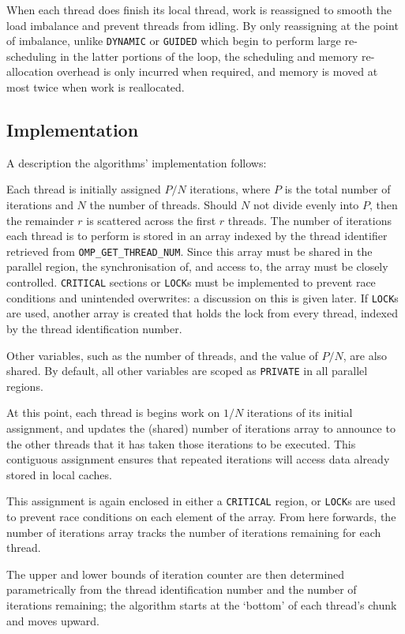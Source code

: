 \documentclass{article} %
\newcommand{\tp}{\texttt}
\begin{document}
When each thread does finish its local thread, work is reassigned to smooth the load imbalance and prevent threads from idling.
By only reassigning at the point of imbalance, unlike \tp{DYNAMIC} or \tp{GUIDED} which begin to perform large re-scheduling in the latter portions of the loop, the scheduling and memory re-allocation overhead is only incurred when required, and memory is moved at most twice when work is reallocated.

\subsection*{Implementation}

A description the algorithms' implementation follows:

Each thread is initially assigned $P/N$ iterations, where $P$ is the total number of iterations and $N$ the number of threads. 
Should $N$ not divide evenly into $P$, then the remainder $r$ is scattered across the first $r$ threads.
The number of iterations each thread is to perform is stored in an array indexed by the thread identifier retrieved from \tp{OMP\_GET\_THREAD\_NUM}.
Since this array must be shared in the parallel region, the synchronisation of, and access to, the array must be closely controlled.
\tp{CRITICAL} sections or \tp{LOCK}s must be implemented to prevent race conditions and unintended overwrites:
a discussion on this is given later.
If \tp{LOCK}s are used, another array is created that holds the lock from every thread, indexed by the thread identification number.

Other variables, such as the number of threads, and the value of $P/N$, are also shared.
By default, all other variables are scoped as \tp{PRIVATE} in all parallel regions.

At this point, each thread is begins work on $1/N$ iterations of its initial assignment, and updates the (shared) number of iterations array to announce to the other threads that it has taken those iterations to be executed.
This contiguous assignment ensures that repeated iterations will access data already stored in local caches.

This assignment is again enclosed in either a \tp{CRITICAL} region, or \tp{LOCK}s are used to prevent race conditions on each element of the array.
From here forwards, the number of iterations array tracks the number of iterations remaining for each thread.

The upper and lower bounds of iteration counter are then determined parametrically from the thread identification number and the number of iterations remaining; the algorithm starts at the `bottom' of each thread's chunk and moves upward.
\end{document}
